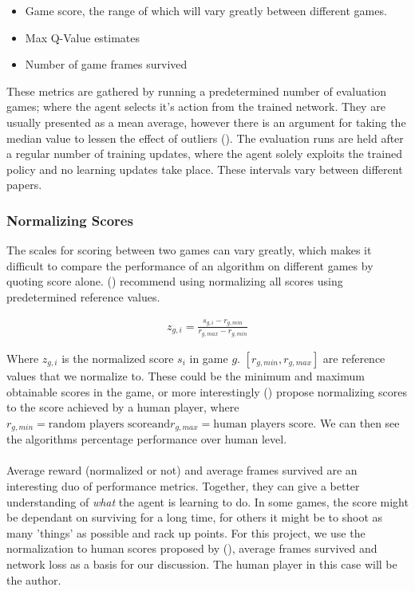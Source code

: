 \begin{itemize}
    \item Game score, the range of which will vary greatly between different games.
    \item Max Q-Value estimates
    \item Number of game frames survived
\end{itemize}

These metrics are gathered by running a predetermined number of evaluation games; where the agent selects it's action from the trained network. They are usually presented as a mean average, however there is an argument for taking the median value to lessen the effect of outliers (\citet{ale-eval-plat}). The evaluation runs are held after a regular number of training updates, where the agent solely exploits the trained policy and no learning updates take place. These intervals vary between different papers.

\subsubsection{Normalizing Scores}
The scales for scoring between two games can vary greatly, which makes it difficult to compare the performance of an algorithm on different games by quoting score alone. (\citet{ale-eval-plat}) recommend using normalizing all scores using predetermined reference values.

\begin{align}
    z_{g, i} = \frac{s_{g, i} - r_{g, min}}{r_{g, max} - r_{g, min}}
\end{align}

Where $z_{g, i}$ is the normalized score $s_i$ in game $g$. $[r_{g, min}, r_{g, max}]$ are reference values that we normalize to. These could be the minimum and maximum obtainable scores in the game, or more interestingly (\citet{human}) propose normalizing scores to the score achieved by a human player, where $r_{g, min} = \text{random players score} \text{and} r_{g, max} = \text{human players score}$. We can then see the algorithms percentage performance over human level. \paragraph{}

Average reward (normalized or not) and average frames survived are an interesting duo of performance metrics. Together, they can give a better understanding of \textit{what} the agent is learning to do. In some games, the score might be dependant on surviving for a long time, for others it might be to shoot as many 'things' as possible and rack up points. For this project, we use the normalization to human scores proposed by (\citet{human}), average frames survived and network loss as a basis for our discussion. The human player in this case will be the author.
